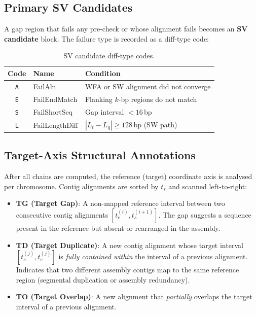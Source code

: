\documentclass[11pt,a4paper]{article}
\begin{document}
\subsection{Primary SV Candidates}

A gap region that fails any pre-check or whose alignment fails becomes an
\textbf{SV candidate} block.  The failure type is recorded as a diff-type code:

\begin{table}[h]
\centering
\caption{SV candidate diff-type codes.}
\begin{tabular}{cll}
\toprule
\textbf{Code} & \textbf{Name} & \textbf{Condition} \\
\midrule
\texttt{A} & FailAln        & WFA or SW alignment did not converge \\
\texttt{E} & FailEndMatch   & Flanking $k$-bp regions do not match \\
\texttt{S} & FailShortSeq   & Gap interval $< 16$\,bp \\
\texttt{L} & FailLengthDiff & $|L_t - L_q| \geq 128$\,bp (SW path) \\
\bottomrule
\end{tabular}
\end{table}

\subsection{Target-Axis Structural Annotations}
\label{sec:target-annot}

After all chains are computed, the reference (target) coordinate axis is
analysed per chromosome.
Contig alignments are sorted by $t_s$ and scanned left-to-right:

\begin{itemize}
  \item \textbf{TG (Target Gap)}: A non-mapped reference interval between two
        consecutive contig alignments $[t_e^{(i)}, t_s^{(i+1)}]$.
        The gap suggests a sequence present in the reference but absent or
        rearranged in the assembly.
  \item \textbf{TD (Target Duplicate)}: A new contig alignment whose target
        interval $[t_s^{(j)}, t_e^{(j)}]$ is \emph{fully contained within}
        the interval of a previous alignment.
        Indicates that two different assembly contigs map to the same reference
        region (segmental duplication or assembly redundancy).
  \item \textbf{TO (Target Overlap)}: A new alignment that \emph{partially}
        overlaps the target interval of a previous alignment.
\end{itemize}
\end{document}
